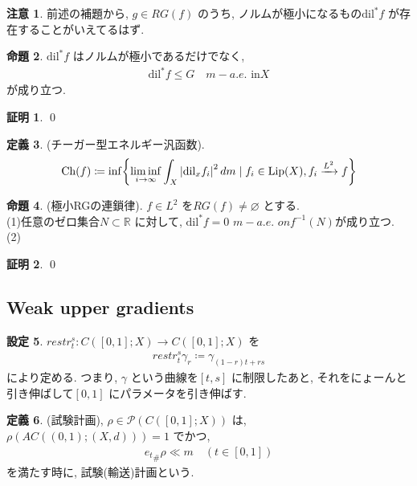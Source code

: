 \documentclass[10pt, fleqn, label-section=none]{bxjsarticle}
\theoremstyle{definition}
\newtheorem{dfn}{定義}[section]
\newtheorem{prop}[dfn]{命題}
\newtheorem{setting}[dfn]{設定}
\newtheorem*{pf*}{証明}
\newtheorem{remark}[dfn]{注意}
\newcommand{\cbra}[1]{\mleft\{#1\mright\}}
\newcommand{\abs}[1]{\left|#1\right|}
\newcommand{\dil}{\textrm{dil}}
\newcommand{\Ch}{\textrm{Ch}}
\newcommand{\Lip}{\textrm{Lip}}
\renewcommand{\;}{\, ; \,}
\begin{document}
\begin{remark}
前述の補題から, $g \in RG(f)$ のうち, ノルムが極小になるもの$\dil^* f$ が存在することがいえてるはず.
\end{remark}

\begin{prop}$\dil^* f$ はノルムが極小であるだけでなく, 
\begin{align*} \dil^* f \leq G \quad m-a.e. \,\, \textrm{in} X \end{align*}
が成り立つ. 
\end{prop}
\begin{pf*}

\qed
\end{pf*}



\begin{dfn}(チーガー型エネルギー汎函数). 
\begin{align*} \Ch(f) \coloneqq \inf \cbra{\liminf_{i \rightarrow \infty} \int_X \abs{\dil_x f_i}^2 dm \mid  f_i \in \Lip(X), f_i \xrightarrow {L^2} f  }\end{align*}

\end{dfn}


\begin{prop}(極小RGの連鎖律). $f \in L^2$ を$RG(f) \neq \varnothing$ とする. \\
(1)任意のゼロ集合$N \subset \mathbb R$ に対して, $\dil^* f = 0 \,\, m-a.e. \,\, on f^{-1}(N)$が成り立つ. \\
(2) 

\end{prop}
\begin{pf*}

\qed
\end{pf*}


\subsection{Weak upper gradients}

\begin{setting}$restr_t^s: C([0,1]; X) \rightarrow C([0,1]; X)$ を
\begin{align*} restr_t^s \gamma _r \coloneqq \gamma_{(1-r)t + rs}\end{align*}
により定める. つまり, $\gamma$ という曲線を$[t,s]$ に制限したあと, それをにょーんと引き伸ばして$[0,1]$ にパラメータを引き伸ばす. 
\end{setting}

\begin{dfn}(試験計画), $\rho \in \mathcal P (C([0,1]; X) )$ は, $\rho(AC((0,1); (X, d))) = 1$ でかつ, 
\begin{align*} {e_{t}}_\# \rho \ll m \quad (t \in [0,1]) \end{align*}
を満たす時に, 試験(輸送)計画という. 
\end{dfn}
\end{document}
